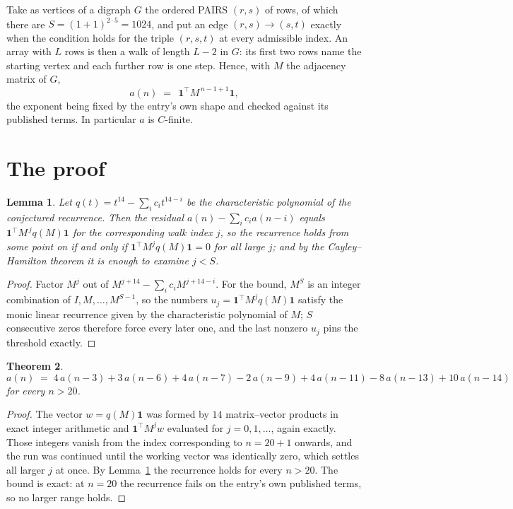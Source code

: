 \documentclass[11pt,a4paper]{article}
\theoremstyle{plain}
\newtheorem{theorem}{Theorem}
\newtheorem{lemma}[theorem]{Lemma}
\theoremstyle{definition}
\begin{document}
Take as vertices of a digraph $G$ the ordered PAIRS $(r,s)$ of rows, of which there are
$S=(1+1)^{2\cdot5}=1024$, and put an edge $(r,s)\to(s,t)$ exactly when the condition
holds for the triple $(r,s,t)$ at every admissible index. An array with $L$ rows is then a
walk of length $L-2$ in $G$: its first two rows name the starting vertex and each further
row is one step. Hence, with $M$ the adjacency matrix of $G$,
\[
a(n)\;=\;\,\mathbf{1}^{\!\top}M^{\,n-1+1}\mathbf{1},
\]
the exponent being fixed by the entry's own shape and checked against its published terms.
In particular $a$ is $C$-finite.

\section{The proof}

\begin{lemma}\label{lem:crit}
Let $q(t)=t^{14}-\sum_i c_it^{14-i}$ be the characteristic polynomial of the
conjectured recurrence. Then the residual $a(n)-\sum_ic_ia(n-i)$ equals
$\mathbf{1}^{\!\top}M^{\,j}q(M)\mathbf{1}$ for the corresponding walk index
$j$, so the recurrence holds from some point on if and only if
$\mathbf{1}^{\!\top}M^{j}q(M)\mathbf{1}=0$ for all large $j$; and by the
Cayley--Hamilton theorem it is enough to examine $j<S$.
\end{lemma}

\begin{proof}
Factor $M^{j}$ out of $M^{j+14}-\sum_ic_iM^{j+14-i}$. For the bound, $M^{S}$
is an integer combination of $I,M,\dots,M^{S-1}$, so the numbers
$u_j=\mathbf{1}^{\!\top}M^{j}q(M)\mathbf{1}$ satisfy the monic linear recurrence given by
the characteristic polynomial of $M$; $S$ consecutive zeros therefore force every later one,
and the last nonzero $u_j$ pins the threshold exactly.
\end{proof}

\begin{theorem}
\[
a(n)\;=\;4\,a(n-3) + 3\,a(n-6) + 4\,a(n-7) - 2\,a(n-9) + 4\,a(n-11) - 8\,a(n-13) + 10\,a(n-14)
\]
for every $n>20$.
\end{theorem}

\begin{proof}
The vector $w=q(M)\mathbf{1}$ was formed by $14$ matrix--vector products in exact
integer arithmetic and $\mathbf{1}^{\!\top}M^{j}w$ evaluated for $j=0,1,\dots$, again
exactly. Those integers vanish from the index corresponding to $n=20+1$ onwards, and the
run was continued until the working vector was identically zero, which settles all larger $j$
at once. By Lemma~\ref{lem:crit} the recurrence holds for every $n>20$. The bound is exact: at $n=20$ the recurrence fails on the entry's own published terms, so no larger range holds.
\end{proof}
\end{document}
